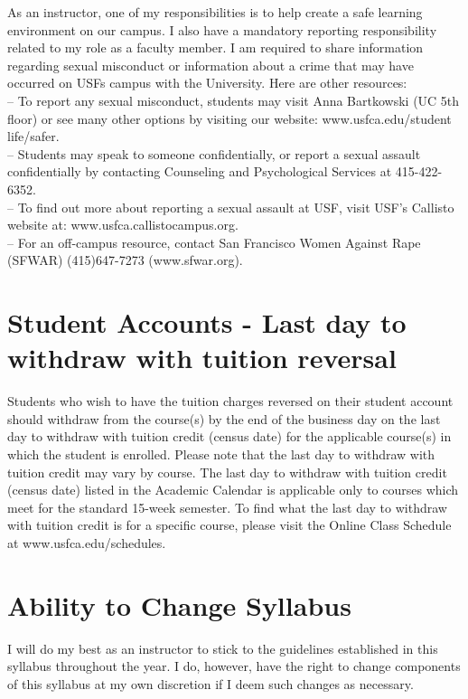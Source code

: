 \documentclass[10pt, oneside]{article}
\begin{document}
As an instructor, one of my responsibilities is to help create a safe learning environment on our campus. I also have a mandatory reporting responsibility related to my role as a faculty member. I am required to share information regarding sexual misconduct or information about a crime that may have occurred on USFs campus with the University. Here are other resources:\\
– To report any sexual misconduct, students may visit Anna Bartkowski (UC 5th floor) or see many other options by visiting our website: www.usfca.edu/student life/safer.\\
– Students may speak to someone confidentially, or report a sexual assault confidentially by contacting Counseling and Psychological Services at 415-422-6352.\\
– To find out more about reporting a sexual assault at USF, visit USF’s Callisto website at: www.usfca.callistocampus.org.\\
– For an off-campus resource, contact San Francisco Women Against Rape (SFWAR) (415)647-7273 (www.sfwar.org). \\

\section*{Student Accounts - Last day to withdraw with tuition reversal}
Students who wish to have the tuition charges reversed on their student account should withdraw from the course(s) by the end of the business day on the last day to withdraw with tuition credit (census date) for the applicable course(s) in which the student is enrolled. Please note that the last day to withdraw with tuition credit may vary by course. The last day to withdraw with tuition credit (census date) listed in the Academic Calendar is applicable only to courses which meet for the standard 15-week semester. To find what the last day to withdraw with tuition credit is for a specific course, please visit the Online Class Schedule at www.usfca.edu/schedules.

\section*{Ability to Change Syllabus} 
I will do my best as an instructor to stick to the guidelines established in this syllabus throughout the year. I do, however, have the right to change components of this syllabus at my own discretion if I deem such changes as necessary.
\end{document}
